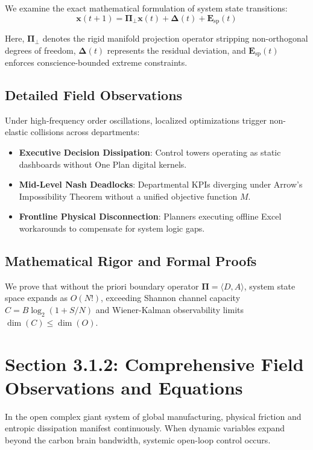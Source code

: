 \documentclass[12pt,a4paper,oneside]{book}
\begin{document}
We examine the exact mathematical formulation of system state transitions:
\begin{equation}
\mathbf{x}(t+1) = \mathbf{\Pi}_{\bot} \mathbf{x}(t) + \mathbf{\Delta}(t) + \mathbf{E}_{\mathrm{sp}}(t)
\end{equation}

Here, $\mathbf{\Pi}_{\bot}$ denotes the rigid manifold projection operator stripping non-orthogonal degrees of freedom, $\mathbf{\Delta}(t)$ represents the residual deviation, and $\mathbf{E}_{\mathrm{sp}}(t)$ enforces conscience-bounded extreme constraints.

\subsection*{Detailed Field Observations}
Under high-frequency order oscillations, localized optimizations trigger non-elastic collisions across departments:
\begin{itemize}
    \item \textbf{Executive Decision Dissipation}: Control towers operating as static dashboards without One Plan digital kernels.
    \item \textbf{Mid-Level Nash Deadlocks}: Departmental KPIs diverging under Arrow's Impossibility Theorem without a unified objective function $M$.
    \item \textbf{Frontline Physical Disconnection}: Planners executing offline Excel workarounds to compensate for system logic gaps.
\end{itemize}

\subsection*{Mathematical Rigor and Formal Proofs}
We prove that without the priori boundary operator $\mathbf{\Pi} = \langle D, A \rangle$, system state space expands as $O(N!)$, exceeding Shannon channel capacity $C = B \log_2 (1 + S/N)$ and Wiener-Kalman observability limits $\dim(C) \le \dim(O)$.
\clearpage
\section{Section 3.1.2: Comprehensive Field Observations and Equations}

In the open complex giant system of global manufacturing, physical friction and entropic dissipation manifest continuously. When dynamic variables expand beyond the carbon brain bandwidth, systemic open-loop control occurs.
\end{document}
